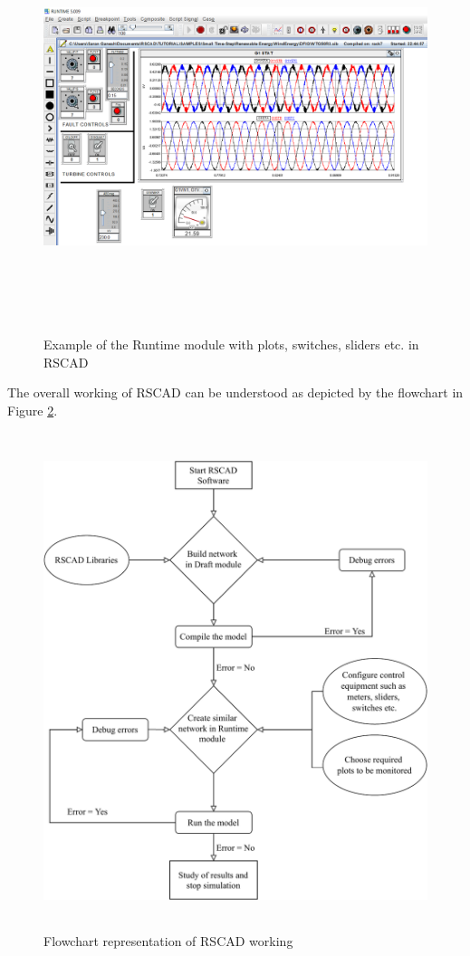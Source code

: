 \begin{figure}[H]
\centering
    \includegraphics[height = 12cm,width = \textwidth]{Diagrams/Chapter_3/Runtime_pic.PNG}
    \caption{Example of the Runtime module with plots, switches, sliders etc. in RSCAD}
    \label{fig:Runtime_RSCAD}
\end{figure}

The overall working of RSCAD can be understood as depicted by the flowchart in Figure \ref{fig:RSCAD_Flowchart}.
\begin{figure}[H]
\centering
    \includegraphics[height = 14.5cm,width = 12.5cm]{Diagrams/Chapter_3/RSCAD_Flowchart.pdf}
    \caption{Flowchart representation of RSCAD working}
    \label{fig:RSCAD_Flowchart}
\end{figure}

